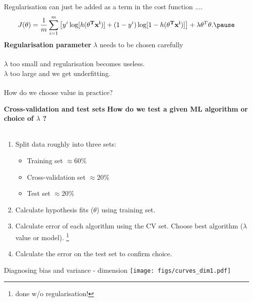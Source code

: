 \documentclass[usenames,dvipsnames]{beamer}
\begin{document}
\begin{frame}
Regularisation can just be added as a term in the cost function .... 
\begin{equation}
J(\theta) = \frac{1}{m} \sum_{i=1}^m \left[ y^i \log[h({\bf \theta^T x^i})] + (1-y^i)\log[1-h({\bf \theta^T x^i})] \right] + \lambda \theta^T\theta . \pause
\end{equation}
{\bf Regularisation parameter } $\lambda$ needs to be chosen carefully \\ \quad \\
$\lambda$ too small and regularisation becomes useless.  \\
$\lambda$ too large and we get underfitting. \\ \quad \\ \pause
How do we choose value in practice? \\ 
\end{frame}

\begin{frame}
{\bf Cross-validation and test sets}   \pause
{\bf \large How do we test a given ML algorithm or choice of $\lambda$ ? } \pause \\ \quad \\

\begin{enumerate}
\item
Split data roughly into three sets: 
\begin{itemize}
\item 
{\color{red} Training} set $\approx  60\%$ 
\item 
{\color{red} Cross-validation} set $\approx  20\%$  
\item
{\color{red} Test} set $\approx  20\%$ 
\end{itemize}
\pause
\item 
Calculate hypothesis fits ($\theta$) using training set. \pause
\item 
Calculate error of each algorithm using the CV set. Choose best algorithm ($\lambda$ value or model).  \footnote{done w/o regularisation!}   \pause 
\item
Calculate the error on the test set to confirm choice. 
\end{enumerate}
\end{frame}

\begin{frame}{Diagnosing bias and variance - dimension}
\centering
    \texttt{[image: figs/curves\_dim1.pdf]} 
\end{frame}
\end{document}
